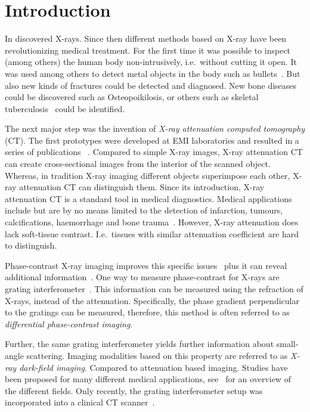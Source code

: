\chapter{Introduction}\label{chap:introduction}

In \citeyear{rontgen_uber_1895} \citeauthor{rontgen_uber_1895} discovered X-rays. Since then
different methods based on X-ray have been revolutionizing medical treatment. For the first time it
was possible to inspect (among others) the human body non-intrusively, i.e.\ without cutting it
open. It was used among others to detect metal objects in the body such as
bullets~\cite{haygood_skeletal_1996}. But also new kinds of fractures could be detected and
diagnosed. New bone diseases could be discovered such as Osteopoikilosis, or others such as skeletal
tuberculosis~\cite{haygood_skeletal_1996} could be identified.

The next major step was the invention of \textit{X-ray attenuation computed tomography} (CT). The
first prototypes were developed at EMI laboratories and resulted in a series of publications
~\cite{hounsfield_computerized_1973,ambrose_computerized_1973, perry_computerized_1973}. Compared to
simple X-ray images, X-ray attenuation CT can create cross-sectional images from the interior of the
scanned object. Whereas, in tradition X-ray imaging different objects superimpose each other, X-ray
attenuation CT can distinguish them. Since its introduction, X-ray attenuation CT is a standard tool
in medical diagnostics. Medical applications include but are by no means limited to the detection of
infarction, tumours, calcifications, haemorrhage and bone trauma~\cite[Chapter 5]{buchanan_advanced_2012}.
However, X-ray attenuation does lack soft-tissue contrast\cite{pfeiffer_phase_2006}. I.e.\
tissues with similar attenuation coefficient are hard to distinguish.

Phase-contrast X-ray imaging improves this specific issues~\cite{lewis_medical_2004} plus it can
reveal additional information~\cite{hahn_numerical_2012}. One way to measure phase-contrast for
X-rays are grating interferometer~\cite{pfeiffer_hard-x-ray_2008}. This information can be measured
using the refraction of X-rays, instead of the attenuation. Specifically, the phase gradient
perpendicular to the gratings can be measured, therefore, this method is often referred to as
\textit{differential phase-contrast imaging}.

Further, the same grating interferometer yields further information about small-angle scattering.
Imaging modalities based on this property are referred to as \textit{X-ray dark-field imaging}.
Compared to attenuation based imaging. Studies have been proposed for many different medical
applications, see~\cite[Chapter 1.3.1]{wieczorek_anisotropic_2017} for an overview of the different
fields. Only recently, the grating interferometer setup was incorporated into a clinical CT
scanner~\cite{viermetz_dark-field_2022}.

